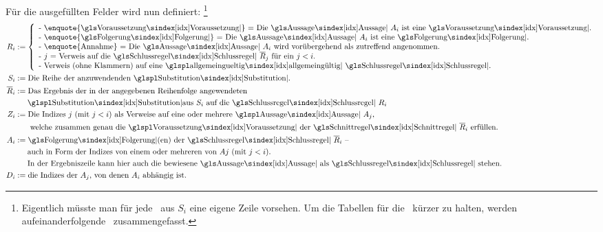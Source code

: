 {Für die ausgefüllten Felder wird nun definiert:%
\footnote{%
	Eigentlich müsste man für jede \Substitution\ aus $S_i$ eine eigene Zeile vorsehen.
	Um die Tabellen für die \Beweise\ kürzer zu halten, werden aufeinanderfolgende \Substitutionen\ zusammengefasst.
}
\begin{align}
	R_i & \defeq
	\left\{
		\begin{array}{l}
			\text{- \enquote{\Voraussetzung} = Die \Aussage\ $A_i$ ist eine \Voraussetzung.}\\
			\text{- \enquote{\Folgerung} = Die \Aussage\ $A_i$ ist eine \Folgerung.}\\
			\text{- \enquote{Annahme} = Die \Aussage\ $A_i$ wird vorübergehend als zutreffend angenommen.}\\
			\text{- $j$ = Verweis auf die \Schlussregel\ $\overline{R}_j$ für ein $j < i$.}\\
			\text{- Verweis (ohne Klammern) auf eine \allgemeingueltige\ \Schlussregel.}
		\end{array}
	\right.
	\\
	S_i & \defeq \text{Die Reihe der anzuwendenden \Substitutionen.}
	\\
	\overline{R}_i & \defeq \text{Das Ergebnis der in der angegebenen Reihenfolge angewendeten}\\
	& \quad\;\; \text{\Substitutionen aus $S_i$ auf die \Schlussregel\ $R_i$}
	\\
	Z_i & \defeq \text{Die Indizes $j$ (mit $j < i$) als Verweise auf eine oder mehrere \Aussagen\ $A_j$,}\\
	& \quad\;\;\text{ welche zusammen genau die \Voraussetzungen\ der \Schnittregel\ } \overline{R}_i \text{ erfüllen.}
	\\
	A_i & \defeq \text{\Folgerung(en) der \Schlussregel\ $\overline{R}_i$ --}\\
	& \quad\;\; \text{auch in Form der Indizes von einem oder mehreren von $Aj$ (mit $j < i$).}\\
	& \quad\;\; \text{In der Ergebniszeile kann hier auch die bewiesene \Aussage\ als \Schlussregel\ stehen.}
	\\
	D_i & \defeq \text{die Indizes der $A_j$, von denen $A_i$ abhängig ist.}
\end{align}

}
